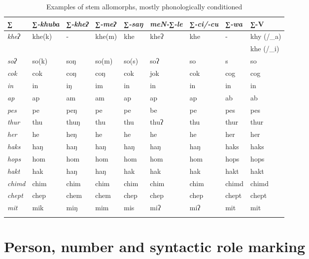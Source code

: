 	
\begin{table}[htp]
{\small
\begin{centering}
\begin{tabular}{lllllllll}
\lsptoprule
∑&∑\emph{-khuba}&∑\emph{-kheʔ}&∑\emph{-meʔ} & ∑\emph{-saŋ} & \emph{meN-∑-le}& ∑\emph{-ci/-cu}& ∑\emph{-wa}&∑-V\\
\midrule
 \emph{kheʔ} & khe(k) &-&khe(m)&khe&kheʔ&khe&-&khy (/\_a) \\%
&&&&&&&&khe (/\_i)\\
 \emph{soʔ}& so(k) &soŋ&so(m)&so(s)&soʔ&so&s&so\\  %
 \emph{cok} & cok&coŋ&coŋ&cok&jok&cok&cog&cog\\%
 \emph{in} &in & iŋ &im&in&in&in&in&in\\%
 \emph{ap}& ap&am&am&ap&ap&ap&ab&ab\\ %
 \emph{pes} & pe&peŋ&pe&pe&be&pe&pes&pes\\%
 \emph{thur}& thu&thuŋ&thu&thu&thuʔ&thu&thur&thur\\ %
 \emph{her} & he&heŋ&he&he&he&he&her&her\\%
 \emph{haks}& haŋ&haŋ&haŋ&haŋ&haŋ&haŋ&haks&haks\\ %
 \emph{hops} & hom&hom&hom&hom&hom&hom&hops&hops\\%
 \emph{hakt} & hak&haŋ&haŋ&hak&hak&hak&hakt&hakt\\%
 \emph{chimd} & chim&chim&chim&chim&chim&chim&chimd&chimd\\%
 \emph{chept} & chep&chem&chem&chep&chep&chep&chept&chept\\%
 \emph{mit} & mik&miŋ&mim&mis&miʔ&miʔ&mit&mit\\%
 \lspbottomrule
\end{tabular}
\caption{Examples of stem allomorphs, mostly phonologically conditioned}\label{tab-mph-stems}
\end{centering}
}
\end{table}



\section{Person, number and syntactic role marking}\label{verb-infl}

